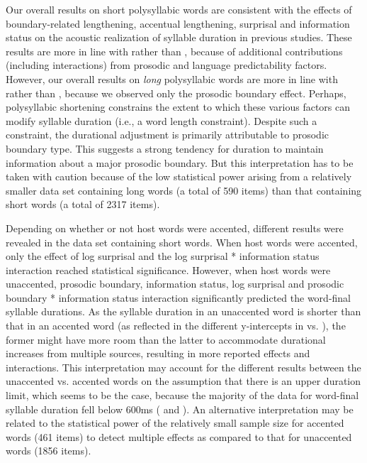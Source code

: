 \documentclass[output=paper,colorlinks,citecolor=brown]{langscibook}
\begin{document}
Our overall results on short polysyllabic words are consistent with the effects of boundary-related lengthening, accentual lengthening, surprisal and information status on the acoustic realization of syllable duration in previous studies. These results are more in line with \citet{Baker2009} rather than \citet{Aylett2004}, because of additional contributions (including interactions) from prosodic and language predictability factors. However, our overall results on \textit{long} polysyllabic words are more in line with \citet{Aylett2004} rather than \citet{Baker2009}, because we observed only the prosodic boundary effect. Perhaps, polysyllabic shortening constrains the extent to which these various factors can modify syllable duration (i.e., a word length constraint). Despite such a constraint, the durational adjustment is primarily attributable to prosodic boundary type. This suggests a strong tendency for duration to maintain information about a major prosodic boundary. But this interpretation has to be taken with caution because of the low statistical power arising from a relatively smaller data set containing long words (a total of 590 items) than that containing short words (a total of 2317 items). 

Depending on whether or not host words were accented, different results were revealed in the data set containing short words. When host words were accented, only the effect of log surprisal and the log surprisal * information status interaction reached statistical significance. However, when host words were unaccented, prosodic boundary, information status, log surprisal and prosodic boundary * information status interaction significantly predicted the word-final syllable durations. As the syllable duration in an unaccented word is shorter than that in an accented word (as reflected in the different y-intercepts in  vs. ), the former might have more room than the latter to accommodate durational increases from multiple sources, resulting in more reported effects and interactions. This interpretation may account for the different results between the unaccented vs. accented words on the assumption that there is an upper duration limit, which seems to be the case, because the majority of the data for word-final syllable duration fell below 600ms ( and ). An alternative interpretation may be related to the statistical power of the relatively small sample size for accented words (461 items) to detect multiple effects as compared to that for unaccented words (1856 items).
\end{document}
